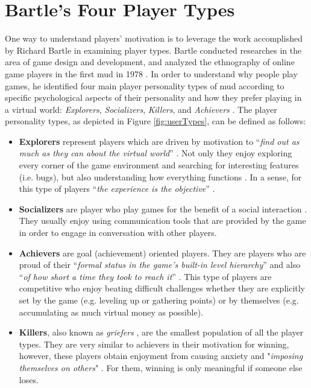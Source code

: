 \section{Bartle's Four Player Types}
One way to understand players' motivation is to leverage the work accomplished by Richard Bartle in examining player types. Bartle conducted researches in the area of game design and development, and analyzed the ethnography of online game players in the first \acrfull{mud} in 1978 \cite{mud}. In order to understand why people play games, he identified four main player personality types of \acrshort{mud} according to specific psychological aspects of their personality and how they prefer playing in a virtual world: \textit{Explorers}, \textit{Socializers}, \textit{Killers}, and \textit{Achievers} \cite{bartle1996hearts}. The player personality types, as depicted in Figure \ref{fig:userTypes}, can be defined as follows:
\begin{itemize}
\item \textbf{Explorers} represent players which are driven by motivation to ``\textit{find out as much as they can about the 
virtual  world}'' \cite{bartle1996hearts}. Not only they enjoy exploring every corner of the game environment and searching for interesting features (i.e. bugs), but also understanding  how 
everything functions \cite{bartle1996hearts}. 
In a sense, for this type of players ``\textit{the experience is the objective}'' \cite{zichermann2011gamification}.
\item \textbf{Socializers} are player who play games for the benefit of a social interaction \cite{zichermann2011gamification}. They usually enjoy using communication tools that are provided by the game in order to engage in conversation with other players. 
\item \textbf{Achievers} are goal (achievement) oriented players. They are players who are proud of their ``\textit{formal status in the game's built-in level hierarchy}'' and also ``\textit{of how short a time they took to reach it}'' \cite{bartle1996hearts}. This type of players are competitive who enjoy beating difficult challenges whether they are explicitly  set by the game (e.g.  leveling  up  or  gathering  points) or by themselves (e.g. accumulating as much virtual money as possible). 
\item \textbf{Killers}, also known as \textit{griefers} \cite{zichermann2011gamification}, are the smallest population of all the player types. They are very similar to achievers in their motivation for winning, however, these players obtain  enjoyment from causing anxiety and "\textit{imposing  themselves  on  others}" \cite{bartle1996hearts}. For them, winning is only meaningful if someone else loses.
\end{itemize}
